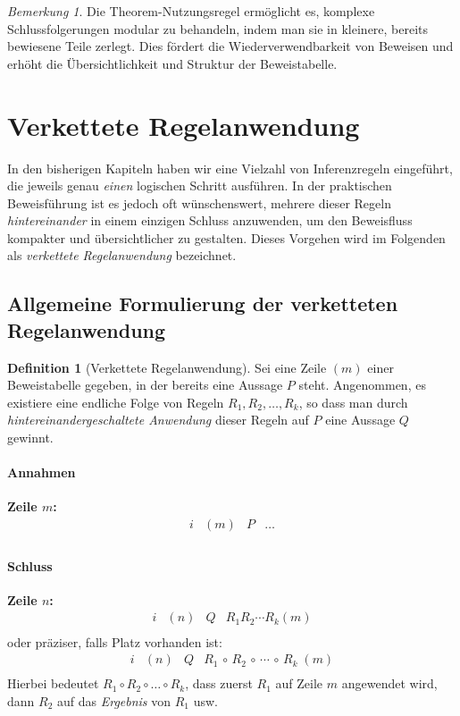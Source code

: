 \documentclass{book}
\theoremstyle{plain}
\theoremstyle{remark}
\newtheorem*{remark}{Bemerkung}
\theoremstyle{definition}
\newtheorem{definition}{Definition}[section]
\begin{document}
\begin{remark}
Die Theorem-Nutzungsregel ermöglicht es, komplexe Schlussfolgerungen modular zu behandeln, indem man sie in kleinere, bereits bewiesene Teile zerlegt. Dies fördert die Wiederverwendbarkeit von Beweisen und erhöht die Übersichtlichkeit und Struktur der Beweistabelle.
\end{remark}

\section{Verkettete Regelanwendung}
In den bisherigen Kapiteln haben wir eine Vielzahl von Inferenzregeln eingeführt, die jeweils genau \emph{einen} logischen Schritt ausführen. In der praktischen Beweisführung ist es jedoch oft wünschenswert, mehrere dieser Regeln \emph{hintereinander} in einem einzigen Schluss anzuwenden, um den Beweisfluss kompakter und übersichtlicher zu gestalten. Dieses Vorgehen wird im Folgenden als \emph{verkettete Regelanwendung} bezeichnet.

\subsection{Allgemeine Formulierung der verketteten Regelanwendung}

\begin{definition}[Verkettete Regelanwendung]
Sei eine Zeile \((m)\) einer Beweistabelle gegeben, in der bereits eine Aussage \(P\) steht. Angenommen, es existiere eine endliche Folge von Regeln \(R_1, R_2, \dots, R_k\), so dass man durch \emph{hintereinandergeschaltete Anwendung} dieser Regeln auf \(P\) eine Aussage \(Q\) gewinnt.

\paragraph{Annahmen}
\textbf{Zeile \(m\):}
\[
\begin{array}{llll}
   i & (m) & P & \dots \\
\end{array}
\]

\paragraph{Schluss}
\textbf{Zeile \(n\):}
\[
\begin{array}{llll}
   i & (n) & Q & R_1R_2\cdots R_k(m) \\
\end{array}
\]
oder präziser, falls Platz vorhanden ist:
\[
\begin{array}{llll}
   i 
   & (n) 
   & Q 
   & R_1 \,\circ\, R_2 \,\circ\,\cdots\,\circ\, R_k \;(m) \\
\end{array}
\]
Hierbei bedeutet \(R_1 \circ R_2 \circ \dots \circ R_k\), dass zuerst \(R_1\) auf Zeile \(m\) angewendet wird, dann \(R_2\) auf das \emph{Ergebnis} von \(R_1\) usw.
\end{definition}
\end{document}
